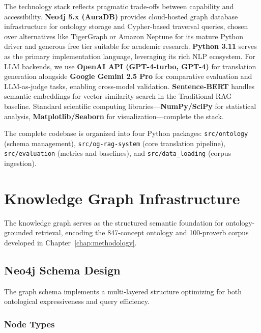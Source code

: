 The technology stack reflects pragmatic trade-offs between capability and accessibility. \textbf{Neo4j 5.x (AuraDB)} provides cloud-hosted graph database infrastructure for ontology storage and Cypher-based traversal queries, chosen over alternatives like TigerGraph or Amazon Neptune for its mature Python driver and generous free tier suitable for academic research. \textbf{Python 3.11} serves as the primary implementation language, leveraging its rich NLP ecosystem. For LLM backends, we use \textbf{OpenAI API (GPT-4-turbo, GPT-4)} for translation generation alongside \textbf{Google Gemini 2.5 Pro} for comparative evaluation and LLM-as-judge tasks, enabling cross-model validation. \textbf{Sentence-BERT} handles semantic embeddings for vector similarity search in the Traditional RAG baseline. Standard scientific computing libraries—\textbf{NumPy/SciPy} for statistical analysis, \textbf{Matplotlib/Seaborn} for visualization—complete the stack.

The complete codebase is organized into four Python packages: \texttt{src/ontology} (schema management), \texttt{src/og-rag-system} (core translation pipeline), \texttt{src/evaluation} (metrics and baselines), and \texttt{src/data\_loading} (corpus ingestion).

\section{Knowledge Graph Infrastructure}
\label{sec:kg_infrastructure}

The knowledge graph serves as the structured semantic foundation for ontology-grounded retrieval, encoding the 847-concept ontology and 100-proverb corpus developed in Chapter~\ref{chap:methodology}.

\subsection{Neo4j Schema Design}
\label{subsec:neo4j_schema}

The graph schema implements a multi-layered structure optimizing for both ontological expressiveness and query efficiency.

\subsubsection{Node Types}
\label{subsubsec:node_types}

